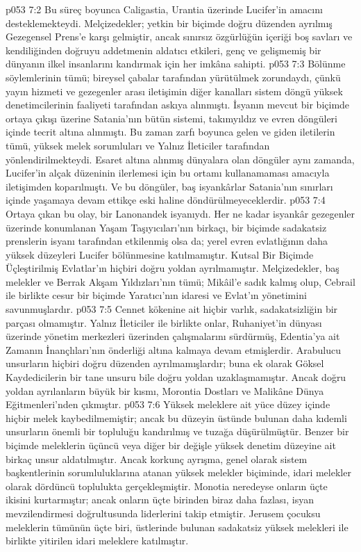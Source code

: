 \vs p053 7:2 Bu süreç boyunca Caligastia, Urantia üzerinde Lucifer’in amacını desteklemekteydi. Melçizedekler; yetkin bir biçimde doğru düzenden ayrılmış Gezegensel Prens’e karşı gelmiştir, ancak sınırsız özgürlüğün içeriği boş savları ve kendiliğinden doğruyu addetmenin aldatıcı etkileri, genç ve gelişmemiş bir dünyanın ilkel insanlarını kandırmak için her imkâna sahipti.
\vs p053 7:3 Bölünme söylemlerinin tümü; bireysel çabalar tarafından yürütülmek zorundaydı, çünkü yayın hizmeti ve gezegenler arası iletişimin diğer kanalları sistem döngü yüksek denetimcilerinin faaliyeti tarafından askıya alınmıştı. İsyanın mevcut bir biçimde ortaya çıkışı üzerine Satania’nın bütün sistemi, takımyıldız ve evren döngüleri içinde tecrit altına alınmıştı. Bu zaman zarfı boyunca gelen ve giden iletilerin tümü, yüksek melek sorumluları ve Yalnız İleticiler tarafından yönlendirilmekteydi. Esaret altına alınmış dünyalara olan döngüler aynı zamanda, Lucifer’in alçak düzeninin ilerlemesi için bu ortamı kullanamaması amacıyla iletişimden koparılmıştı. Ve bu döngüler, baş isyankârlar Satania’nın sınırları içinde yaşamaya devam ettikçe eski haline döndürülmeyeceklerdir.
\vs p053 7:4 Ortaya çıkan bu olay, bir Lanonandek isyanıydı. Her ne kadar isyankâr gezegenler üzerinde konumlanan Yaşam Taşıyıcıları’nın birkaçı, bir biçimde sadakatsiz prenslerin isyanı tarafından etkilenmiş olsa da; yerel evren evlatlığının daha yüksek düzeyleri Lucifer bölünmesine katılmamıştır. Kutsal Bir Biçimde Üçleştirilmiş Evlatlar’ın hiçbiri doğru yoldan ayrılmamıştır. Melçizedekler, baş melekler ve Berrak Akşam Yıldızları’nın tümü; Mikâil’e sadık kalmış olup, Cebrail ile birlikte cesur bir biçimde Yaratıcı’nın idaresi ve Evlat’ın yönetimini savunmuşlardır.
\vs p053 7:5 Cennet kökenine ait hiçbir varlık, sadakatsizliğin bir parçası olmamıştır. Yalnız İleticiler ile birlikte onlar, Ruhaniyet’in dünyası üzerinde yönetim merkezleri üzerinden çalışmalarını sürdürmüş, Edentia’ya ait Zamanın İnançlıları’nın önderliği altına kalmaya devam etmişlerdir. Arabulucu unsurların hiçbiri doğru düzenden ayrılmamışlardır; buna ek olarak Göksel Kaydedicilerin bir tane unsuru bile doğru yoldan uzaklaşmamıştır. Ancak doğru yoldan ayrılanların büyük bir kısmı, Morontia Dostları ve Malikâne Dünya Eğitmenleri’nden çıkmıştır.
\vs p053 7:6 Yüksek meleklere ait yüce düzey içinde hiçbir melek kaybedilmemiştir; ancak bu düzeyin üstünde bulunan daha kıdemli unsurların önemli bir topluluğu kandırılmış ve tuzağa düşürülmüştür. Benzer bir biçimde meleklerin üçüncü veya diğer bir değişle yüksek denetim düzeyine ait birkaç unsur aldatılmıştır. Ancak korkunç ayrışma, genel olarak sistem başkentlerinin sorumluluklarına atanan yüksek melekler biçiminde, idari melekler olarak dördüncü toplulukta gerçekleşmiştir. Monotia neredeyse onların üçte ikisini kurtarmıştır; ancak onların üçte birinden biraz daha fazlası, isyan mevzilendirmesi doğrultusunda liderlerini takip etmiştir. Jerusem çocuksu meleklerin tümünün üçte biri, üstlerinde bulunan sadakatsiz yüksek melekleri ile birlikte yitirilen idari meleklere katılmıştır.
